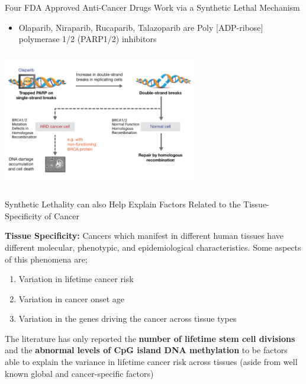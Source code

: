 \documentclass{beamer}
\begin{document}
	\begin{frame}{Four FDA Approved Anti-Cancer Drugs Work via a Synthetic Lethal Mechanism}
		\begin{itemize}
			\item Olaparib, Niraparib, Rucaparib, Talazoparib are Poly [ADP-ribose] polymerase 1/2 (PARP1/2) inhibitors
		\end{itemize}
		\centering
		\includegraphics[width=8.5cm, height=6cm]{olaparib2.png}
		
	\end{frame}

	\begin{frame}{Synthetic Lethality can also Help Explain Factors Related to the Tissue-Specificity of Cancer}
		
	\textbf{\color{blue}Tissue Specificity:} Cancers which manifest in different human tissues have different molecular, phenotypic, and epidemiological characteristics. Some aspects of this phenomena are; \newline
	
	\begin{enumerate}
		\item Variation in lifetime cancer risk
		\item Variation in cancer onset age
		\item Variation in the genes driving the cancer across tissue types \newline
	\end{enumerate}
		The literature has only reported the \textbf{\color{blue}number of lifetime stem cell divisions} and the \textbf{\color{blue}abnormal levels of CpG island DNA methylation} to be factors able to explain the variance in lifetime cancer risk across tissues (aside from well known global and cancer-specific factors)
	\end{frame}
\end{document}
